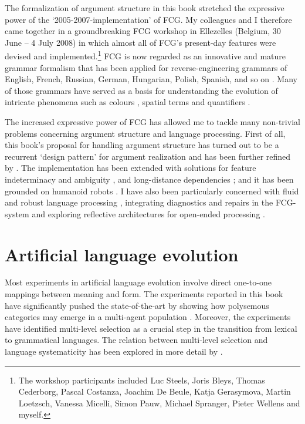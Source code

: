 The formalization of argument structure in this book stretched the expressive power of the `2005-2007-implementation' of FCG. My colleagues and I therefore came together in a groundbreaking FCG workshop in Ellezelles (Belgium, 30 June -- 4 July 2008) in which almost all of FCG's present-day features were devised and implemented.\footnote{The workshop participants included Luc Steels, Joris Bleys, Thomas Cederborg, Pascal Costanza, Joachim De Beule, Katja Gerasymova, Martin Loetzsch, Vanessa Micelli, Simon Pauw, Michael Spranger, Pieter Wellens and myself.} FCG is now regarded as an innovative and mature grammar formalism \citep{vantrijp13comparison} that has been applied for reverse-engineering grammars of English, French, Russian, German, Hungarian, Polish, Spanish, and so on \citep{steels11design,steels12computational,steels12language}. Many of those grammars have served as a basis for understanding the evolution of intricate phenomena such as colours \citep{bleys10}, spatial terms \citep{spranger:11b} and quantifiers \citep{pauw13}.

The increased expressive power of FCG has allowed me to tackle many non-trivial problems concerning argument structure and language processing. First of all, this book's proposal for handling argument structure has turned out to be a recurrent `design pattern' for argument realization and has been further refined by \citet{vantrijp11design}. The implementation has been extended with solutions for feature indeterminacy and ambiguity \citep{vantrijp11feature}, and long-distance dependencies \citep{vantrijp14}; and it has been grounded on humanoid robots \citep{steels12action}. I have also been particularly concerned with fluid and robust language processing \citep{steels11how}, integrating diagnostics and repairs in the FCG-system \citep{beuls12diagnostics} and exploring reflective architectures for open-ended processing \citep{vantrijp12robust}.

\section*{Artificial language evolution}

Most experiments in artificial language evolution involve direct one-to-one mappings between meaning and form. The experiments reported in this book have significantly pushed the state-of-the-art by showing how polysemous categories may emerge in a multi-agent population \citep[for more recent results, see][]{vantrijp10grammaticalization,vantrijp:11a,vantrijp12b,vantrijp12case}. Moreover, the experiments have identified multi-level selection as a crucial step in the transition from lexical to grammatical languages. The relation between multi-level selection and language systematicity has been explored in more detail by \citet{vantrijp:12f}.

